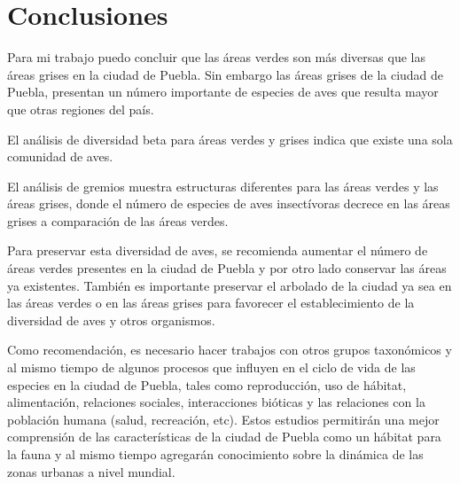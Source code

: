 \documentclass[letterpaper,12pt]{article}
\begin{document}
\section{Conclusiones}
Para mi trabajo puedo concluir que las áreas verdes son más diversas que las áreas grises en la ciudad de Puebla.
Sin embargo las áreas grises de la ciudad de Puebla, presentan un número importante de especies de aves que resulta mayor que otras regiones del país.

El análisis de  diversidad beta para áreas verdes y grises indica  que existe una sola comunidad de aves.

El análisis de gremios muestra estructuras diferentes para las áreas verdes y las áreas grises, donde el número de especies de aves insectívoras decrece en las áreas grises a comparación de las áreas verdes.

Para preservar esta diversidad de aves, se recomienda aumentar el número de áreas verdes presentes en la ciudad de Puebla y por otro lado conservar las áreas ya existentes. También es importante preservar el arbolado de la ciudad ya sea en las áreas verdes o en las áreas grises para favorecer el establecimiento de la diversidad de aves y otros organismos.

Como recomendación, es necesario hacer trabajos con otros grupos taxonómicos y al mismo tiempo de algunos procesos que influyen en el ciclo de vida de las especies en la ciudad de Puebla, tales como reproducción, uso de hábitat, alimentación, relaciones sociales, interacciones bióticas y las relaciones con la población humana (salud, recreación, etc). Estos estudios permitirán una mejor comprensión de las características de la ciudad de Puebla como un hábitat para la fauna y al mismo tiempo agregarán conocimiento sobre la dinámica de las zonas urbanas a nivel mundial. 
\end{document}
